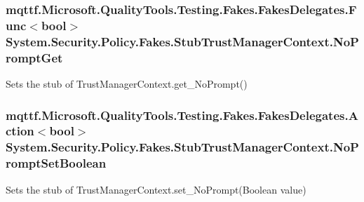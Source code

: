 \hypertarget{class_system_1_1_security_1_1_policy_1_1_fakes_1_1_stub_trust_manager_context_a4d1c96a8b2baa0590251231427f9f155}{
\subsubsection[{No\-Prompt\-Get}]{\setlength{\rightskip}{0pt plus 5cm}mqttf.\-Microsoft.\-Quality\-Tools.\-Testing.\-Fakes.\-Fakes\-Delegates.\-Func$<$bool$>$ System.\-Security.\-Policy.\-Fakes.\-Stub\-Trust\-Manager\-Context.\-No\-Prompt\-Get}}\label{class_system_1_1_security_1_1_policy_1_1_fakes_1_1_stub_trust_manager_context_a4d1c96a8b2baa0590251231427f9f155}


Sets the stub of Trust\-Manager\-Context.\-get\-\_\-\-No\-Prompt()

\hypertarget{class_system_1_1_security_1_1_policy_1_1_fakes_1_1_stub_trust_manager_context_a566bbd63400c82c5c7d1703053f593e9}{
\subsubsection[{No\-Prompt\-Set\-Boolean}]{\setlength{\rightskip}{0pt plus 5cm}mqttf.\-Microsoft.\-Quality\-Tools.\-Testing.\-Fakes.\-Fakes\-Delegates.\-Action$<$bool$>$ System.\-Security.\-Policy.\-Fakes.\-Stub\-Trust\-Manager\-Context.\-No\-Prompt\-Set\-Boolean}}\label{class_system_1_1_security_1_1_policy_1_1_fakes_1_1_stub_trust_manager_context_a566bbd63400c82c5c7d1703053f593e9}


Sets the stub of Trust\-Manager\-Context.\-set\-\_\-\-No\-Prompt(\-Boolean value)

